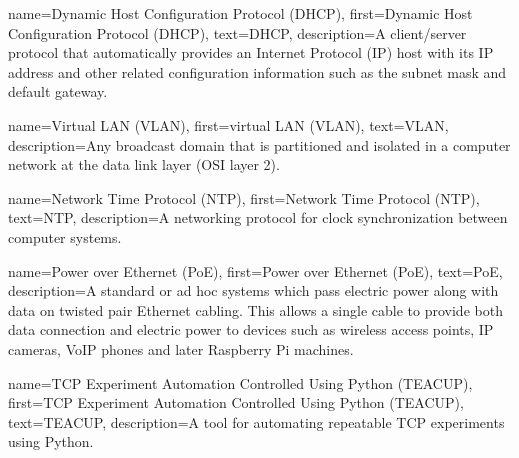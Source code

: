 {
    name={Dynamic Host Configuration Protocol (DHCP)},
    first={Dynamic Host Configuration Protocol (DHCP)},
    text={DHCP},
    description={A client/server protocol that automatically provides an Internet Protocol (IP) host with its IP address and other related configuration information such as the subnet mask and default gateway.}
}

{
    name={Virtual LAN (VLAN)},
    first={virtual LAN (VLAN)},
    text={VLAN},
    description={Any broadcast domain that is partitioned and isolated in a computer network at the data link layer (OSI layer 2).}
}

{
    name={Network Time Protocol (NTP)},
    first={Network Time Protocol (NTP)},
    text={NTP},
    description={A networking protocol for clock synchronization between computer systems.}
}

{
    name={Power over Ethernet (PoE)},
    first={Power over Ethernet (PoE)},
    text={PoE},
    description={A standard or ad hoc systems which pass electric power along with data on twisted pair Ethernet cabling. This allows a single cable to provide both data connection and electric power to devices such as wireless access points, IP cameras, VoIP phones and later Raspberry Pi machines.}
}

{
    name={TCP Experiment Automation Controlled Using Python (TEACUP)},
    first={TCP Experiment Automation Controlled Using Python (TEACUP)},
    text={TEACUP},
    description={A tool for automating repeatable TCP experiments using Python.}
}